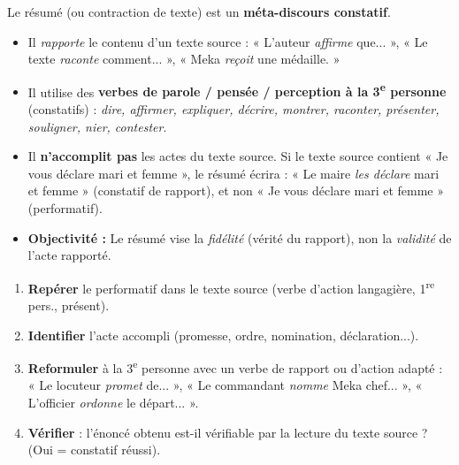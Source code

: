 \documentclass[11pt]{article}
\begin{document}
\begin{aretenir}
Le résumé (ou contraction de texte) est un \textbf{méta-discours constatif}.
\begin{itemize}
    \item Il \emph{rapporte} le contenu d'un texte source : « L'auteur \emph{affirme} que... », « Le texte \emph{raconte} comment... », « Meka \emph{reçoit} une médaille. »
    \item Il utilise des \textbf{verbes de parole / pensée / perception à la 3\textsuperscript{e} personne} (constatifs) : \emph{dire, affirmer, expliquer, décrire, montrer, raconter, présenter, souligner, nier, contester}.
    \item Il \textbf{n'accomplit pas} les actes du texte source. Si le texte source contient « Je vous déclare mari et femme », le résumé écrira : « Le maire \emph{les déclare} mari et femme » (constatif de rapport), et non « Je vous déclare mari et femme » (performatif).
    \item \textbf{Objectivité :} Le résumé vise la \emph{fidélité} (vérité du rapport), non la \emph{validité} de l'acte rapporté.
\end{itemize}
\end{aretenir}

\begin{methode}
\begin{enumerate}
    \item \textbf{Repérer} le performatif dans le texte source (verbe d'action langagière, 1\textsuperscript{re} pers., présent).
    \item \textbf{Identifier} l'acte accompli (promesse, ordre, nomination, déclaration...).
    \item \textbf{Reformuler} à la 3\textsuperscript{e} personne avec un verbe de rapport ou d'action adapté : « Le locuteur \emph{promet} de... », « Le commandant \emph{nomme} Meka chef... », « L'officier \emph{ordonne} le départ... ».
    \item \textbf{Vérifier} : l'énoncé obtenu est-il vérifiable par la lecture du texte source ? (Oui = constatif réussi).
\end{enumerate}
\end{methode}
\end{document}
